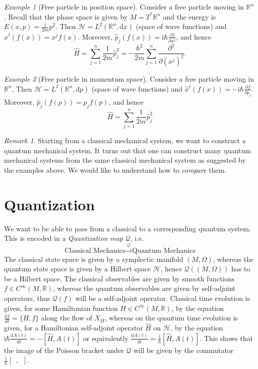 \documentclass[11pt]{amsart}
\numberwithin{equation}{section}
\theoremstyle{plain}
\theoremstyle{definition}
\theoremstyle{remark}
\newtheorem{rem}{Remark}[subsection]
\newtheorem{ex}{Example}[subsection]
\newcommand{\R}{\mathbb{R}}
\newcommand{\dd}{{\mathrm{d}}}
\newcommand{\calH}{\mathcal{H}}
\newcommand{\I}{\mathrm{i}}
\begin{document}
\begin{ex}[Free particle in position space]
Consider a free particle moving in $\R^n$. Recall that the phase space is given by $M=T^*\R^n$ and the energy is $E(x,p)=\frac{1}{2m}p^2$. Then $\calH=L^2(\R^n,\dd x)$ (space of wave functions) and $\widehat{x}^j(f(x))=x^jf(x)$. Moreover, $\widehat{p}_j(f(x))=\I\hbar\frac{\partial f}{\partial x^j}$, and hence 
$$\widehat{H}=\sum_{j=1}^n\frac{1}{2m}\widehat{p}_j^2=-\frac{\hbar^2}{2m}\sum_{j=1}^n\frac{\partial^2}{\partial (x^j)^2}.$$
\end{ex}

\begin{ex}[Free particle in momentum space]
Consider a free particle moving in $\R^n$. Then $\calH=L^2(\R^n,\dd p)$ (space of wave functions) and $\widehat{x}^j(f(x))=-\I\hbar\frac{\partial f}{\partial p_j}$. Moreover, $\widehat{p}_j(f(p))=p_jf(p)$, and hence 
$$\widehat{H}=\sum_{j=1}^n\frac{1}{2m}\widehat{p}_j^2$$
\end{ex}

\begin{rem}
Starting from a classical mechanical system, we want to construct a quantum mechanical system. It turns out that one can construct many quantum mechanical systems from the same classical mechanical system as suggested by the examples above. We would like to understand how to \emph{compare} them.
\end{rem}

\section{Quantization}
We want to be able to pass from a classical to a corresponding quantum system. This is encoded in a \emph{Quantization map} $\mathscr{Q}$, i.e.
\[
\text{Classical Mechanics}\xrightarrow{\mathscr{Q}}\text{Quantum Mechanics}
\]
The classical state space is given by a symplectic manifold $(M,\Omega)$, whereas the quantum state space is given by a Hilbert space $\calH$, hence $\mathscr{Q}((M,\Omega))$ has to be a Hilbert space. The classical observables are given by smooth functions $f\in C^\infty(M,\R)$, whereas the quantum observables are given by self-adjoint operators, thus $\mathscr{Q}(f)$ will be a self-adjoint operator. Classical time evolution is given, for some Hamiltonian function $H\in C^\infty(M,\R)$, by the equation $\frac{\dd f}{\dd t}=\{H,f\}$ along the flow of $X_H$, whereas on the quantum time evolution is given, for a Hamiltonian self-adjoint operator $\widehat{H}$ on $\calH$, by the equation $\I\hbar\frac{\dd A(t)}{\dd t}=-[\widehat{H},A(t)]$ or equivalently $\frac{\dd A(t)}{\dd t}=\frac{\I}{\hbar}[\widehat{H},A(t)]$. This shows that the image of the Poisson bracket under $\mathscr{Q}$ will be given by the commutator $\frac{\I}{\hbar}[\enspace,\enspace]$. 
\end{document}
